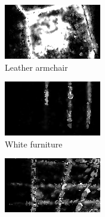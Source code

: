 \begin{figure}[h!t]
    \begin{subfigure}[b]{0.25\textwidth}
        \centering
        \includegraphics[width=0.9\linewidth]{images/materials/leather-conf}
        \caption{Leather armchair}
        \label{fig:material-leather}
    \end{subfigure}%
    \begin{subfigure}[b]{0.25\textwidth}
        \centering
        \includegraphics[width=0.9\linewidth]{images/materials/whiteFurniture-conf}
        \caption{White furniture}
        \label{fig:material-whiteFurniture}
    \end{subfigure}%
    \begin{subfigure}[b]{0.25\textwidth}
        \centering
        \includegraphics[width=0.9\linewidth]{images/materials/tiles-conf}

\end{subfigure}
\end{figure}
